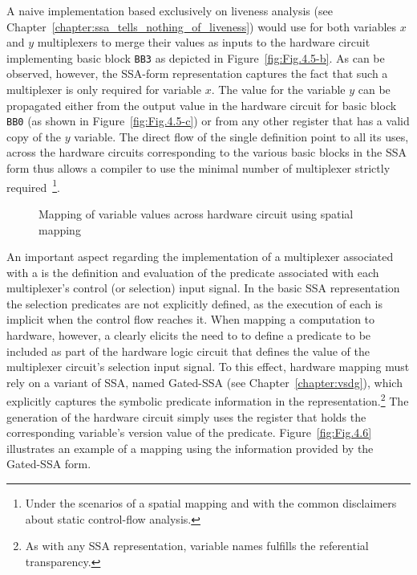 A naive implementation based exclusively on liveness analysis (see Chapter~\ref{chapter:ssa_tells_nothing_of_liveness}) would use for both variables $x$ and $y$ multiplexers to merge their values as inputs to the hardware circuit implementing basic block {\tt BB3} as depicted in Figure~\ref{fig:Fig.4.5-b}. 
As can be observed, however, the SSA-form representation captures the fact that such a multiplexer is only required for variable $x$. 
The value for the variable $y$ can be propagated either from the output value in the hardware circuit for basic block {\tt BB0} (as shown in Figure~\ref{fig:Fig.4.5-c}) or from any other register that has a valid copy of the $y$ variable. 
The direct flow of the single definition point to all its uses, across the hardware circuits corresponding to the various basic blocks in the SSA form thus allows a compiler to use the minimal number of multiplexer strictly required~\footnote{Under the scenarios of a spatial mapping and with the common disclaimers about static control-flow analysis.}.

\begin{figure}[htbp]
\centering
  
\caption{Mapping of variable values across hardware circuit using spatial mapping}
\label{fig:Fig.4.5}
\end{figure}

An important aspect regarding the implementation of a multiplexer associated with a \phifun is the definition and evaluation of the predicate associated with each multiplexer's control (or selection) input signal. 
In the basic SSA representation the selection predicates are not explicitly defined, as the execution of each \phifun is implicit when the control flow reaches it. 
When mapping a computation to hardware, however, a \phifun clearly elicits the need to  to define a predicate to be included as part of the hardware logic circuit that defines the value of the multiplexer circuit's selection input signal.  
To this effect, hardware mapping must rely on a variant of SSA, named Gated-SSA  (see Chapter~\ref{chapter:vsdg}), which explicitly captures the symbolic predicate information in the representation.\footnote{As with any SSA representation,   variable names  fulfills the referential transparency. }
The generation of the hardware circuit simply uses the register that holds the corresponding variable's version value of the predicate.
Figure~\ref{fig:Fig.4.6} illustrates an example of a mapping using the information provided by the Gated-SSA form.

